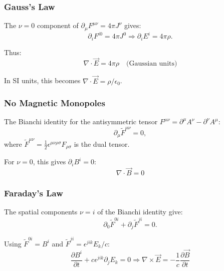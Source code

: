 \documentclass[12pt,a4paper]{article}
\theoremstyle{definition}
\theoremstyle{remark}
\begin{document}
\subsubsection{Gauss's Law}

The $\nu = 0$ component of $\partial_\mu F^{\mu\nu} = 4\pi J^\nu$ gives:
\begin{equation}
\partial_i F^{i0} = 4\pi J^0 \Rightarrow \partial_i E^i = 4\pi \rho.
\end{equation}

Thus:
\begin{equation}
\boxed{\nabla \cdot \vec{E} = 4\pi\rho} \quad \text{(Gaussian units)}
\end{equation}

In SI units, this becomes $\nabla \cdot \vec{E} = \rho/\epsilon_0$.

\subsubsection{No Magnetic Monopoles}

The Bianchi identity for the antisymmetric tensor $F^{\mu\nu} = \partial^\mu A^\nu - \partial^\nu A^\mu$:
\begin{equation}
\partial_\mu \tilde{F}^{\mu\nu} = 0,
\end{equation}
where $\tilde{F}^{\mu\nu} = \frac{1}{2}\epsilon^{\mu\nu\rho\sigma} F_{\rho\sigma}$ is the dual tensor.

For $\nu = 0$, this gives $\partial_i B^i = 0$:
\begin{equation}
\boxed{\nabla \cdot \vec{B} = 0}
\end{equation}

\subsubsection{Faraday's Law}

The spatial components $\nu = i$ of the Bianchi identity give:
\begin{equation}
\partial_0 \tilde{F}^{0i} + \partial_j \tilde{F}^{ji} = 0.
\end{equation}

Using $\tilde{F}^{0i} = B^i$ and $\tilde{F}^{ji} = \epsilon^{jik} E_k/c$:
\begin{equation}
\frac{\partial B^i}{\partial t} + c \epsilon^{jik} \partial_j E_k = 0 \Rightarrow \boxed{\nabla \times \vec{E} = -\frac{1}{c}\frac{\partial \vec{B}}{\partial t}}
\end{equation}
\end{document}
